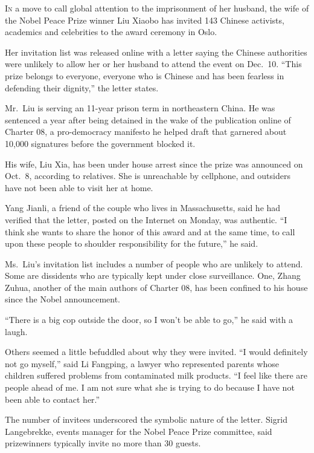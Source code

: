 ﻿\documentclass[12pt]{article}
\begin{document}
\lettrine{I}{n} a move to call global attention to the imprisonment of her
husband, the wife of the Nobel Peace Prize winner Liu Xiaobo has invited 143 Chinese activists,
academics and celebrities to the award ceremony in Oslo.

Her invitation list was released online with a letter saying the Chinese authorities were unlikely
to allow her or her husband to attend the event on Dec.~10. ``This prize belongs to everyone,
everyone who is Chinese and has been fearless in defending their dignity,'' the letter states.

Mr.~Liu is serving an 11-year prison term in northeastern China. He was sentenced a year after being
detained in the wake of the publication online of Charter 08, a pro-democracy manifesto he helped
draft that garnered about 10,000 signatures before the government blocked it.

His wife, Liu Xia, has been under house arrest since the prize was announced on Oct.~8, according to
relatives. She is unreachable by cellphone, and outsiders have not been able to visit her at home.

Yang Jianli, a friend of the couple who lives in Massachusetts, said he had verified that the
letter, posted on the Internet on Monday, was authentic. ``I think she wants to share the honor of
this award and at the same time, to call upon these people to shoulder responsibility for the
future,'' he said.

Ms.~Liu's invitation list includes a number of people who are unlikely to attend. Some are
dissidents who are typically kept under close surveillance. One, Zhang Zuhua, another of the main
authors of Charter 08, has been confined to his house since the Nobel announcement.

``There is a big cop outside the door, so I won't be able to go,'' he said with a laugh.

Others seemed a little befuddled about why they were invited. ``I would definitely not go myself,''
said Li Fangping, a lawyer who represented parents whose children suffered problems from
contaminated milk products. ``I feel like there are people ahead of me. I am not sure what she is
trying to do because I have not been able to contact her.''

The number of invitees underscored the symbolic nature of the letter. Sigrid Langebrekke, events
manager for the Nobel Peace Prize committee, said prizewinners typically invite no more than 30
guests.
\end{document}

